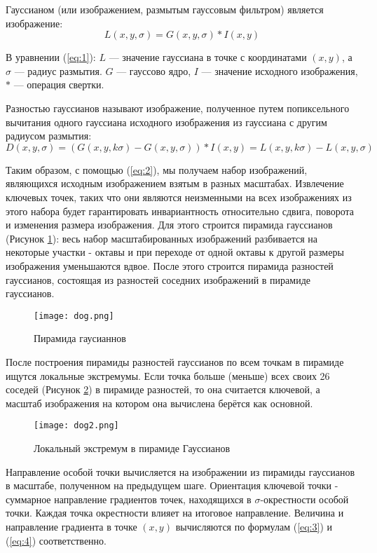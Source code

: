 Гауссианом (или изображением, размытым гауссовым фильтром) является изображение:
\begin{equation} \label{eq:1}
    L(x,y,\sigma) = G(x,y,\sigma) * I(x,y)
\end{equation}

В уравнении (\ref{eq:1}): $L$ — значение гауссиана в точке с координатами $(x,y)$, а $\sigma$ — радиус размытия. $G$ — гауссово ядро, $I$ — значение исходного изображения, $*$ — операция свертки.

Разностью гауссианов называют изображение, полученное путем попиксельного вычитания одного гауссиана исходного изображения из гауссиана с другим радиусом размытия:
\begin{equation} \label{eq:2}
    D(x,y,\sigma) = (G(x,y,k\sigma)-G(x,y,\sigma)) * I(x,y) = L(x,y,k\sigma) - L(x,y,\sigma)
\end{equation}

Таким образом, с помощью (\ref{eq:2}), мы получаем набор изображений, являющихся исходным изображением взятым в разных масштабах. Извлечение ключевых точек, таких что они являются неизменными на всех изображениях из этого набора будет гарантировать инвариантность относительно сдвига, поворота и изменения размера изображения. Для этого строится пирамида гауссианов (Рисунок \ref{fig:dog1}): весь набор масштабированных изображений разбивается на некоторые участки - октавы и при переходе от одной октавы к другой размеры изображения уменьшаются вдвое. После этого строится пирамида разностей гауссианов, состоящая из разностей соседних изображений в пирамиде гауссианов.

\begin{figure}[h]
    \centering
    \texttt{[image: dog.png]}
    \caption{Пирамида гаусианнов}
    \label{fig:dog1}
\end{figure}

После построения пирамиды разностей гауссианов по всем точкам в пирамиде ищутся локальные экстремумы. Если точка больше (меньше) всех своих 26 соседей (Рисунок \ref{fig:dog2}) в пирамиде разностей, то она считается ключевой, а масштаб изображения на котором она вычислена берётся как основной.

\begin{figure}[h]
    \centering
    \texttt{[image: dog2.png]}
    \caption{Локальный экстремум в пирамиде Гауссианов}
    \label{fig:dog2}
\end{figure}

Направление особой точки вычисляется на изображении из пирамиды гауссианов в масштабе, полученном на предыдущем шаге. Ориентация ключевой точки - суммарное направление градиентов точек, находящихся в  $\sigma$-окрестности особой точки. Каждая точка окрестности влияет на итоговое направление. Величина и направление градиента в точке $(x,y)$ вычисляются по формулам (\ref{eq:3}) и (\ref{eq:4}) соответственно.

